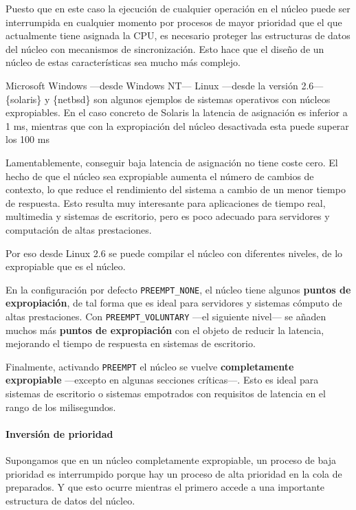 Puesto que en este caso la ejecución de cualquier operación en el núcleo
puede ser interrumpida en cualquier momento por procesos de mayor
prioridad que el que actualmente tiene asignada la CPU, es necesario
proteger las estructuras de datos del núcleo con mecanismos de
sincronización. Esto hace que el diseño de un núcleo de estas
características sea mucho más complejo.

Microsoft Windows ---desde Windows NT--- Linux ---desde la versión
2.6--- \{solaris\} y \{netbsd\} son algunos ejemplos de sistemas
operativos con núcleos expropiables. En el caso concreto de Solaris la
latencia de asignación es inferior a 1 ms, mientras que con la
expropiación del núcleo desactivada esta puede superar los 100 ms

Lamentablemente, conseguir baja latencia de asignación no tiene coste
cero. El hecho de que el núcleo sea expropiable aumenta el número de
cambios de contexto, lo que reduce el rendimiento del sistema a cambio
de un menor tiempo de respuesta. Esto resulta muy interesante para
aplicaciones de tiempo real, multimedia y sistemas de escritorio, pero
es poco adecuado para servidores y computación de altas prestaciones.

Por eso desde Linux 2.6 se puede compilar el núcleo con diferentes
niveles, de lo expropiable que es el núcleo.

En la configuración por defecto \texttt{PREEMPT\_NONE}, el núcleo tiene
algunos \textbf{puntos de expropiación}, de tal forma que es ideal para
servidores y sistemas cómputo de altas prestaciones. Con
\texttt{PREEMPT\_VOLUNTARY} ---el siguiente nivel--- se añaden muchos
más \textbf{puntos de expropiación} con el objeto de reducir la
latencia, mejorando el tiempo de respuesta en sistemas de escritorio.

Finalmente, activando \texttt{PREEMPT} el núcleo se vuelve
\textbf{completamente expropiable} ---excepto en algunas secciones
críticas---. Esto es ideal para sistemas de escritorio o sistemas
empotrados con requisitos de latencia en el rango de los milisegundos.

\paragraph{Inversión de prioridad}\label{_inversiuxf3n_de_prioridad}

Supongamos que en un núcleo completamente expropiable, un proceso de
baja prioridad es interrumpido porque hay un proceso de alta prioridad
en la cola de preparados. Y que esto ocurre mientras el primero accede a
una importante estructura de datos del núcleo.

